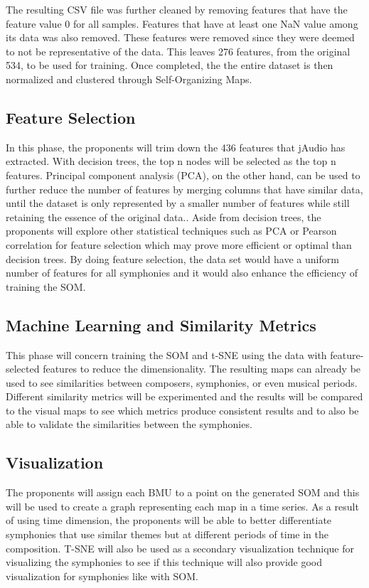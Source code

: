 The resulting CSV file was further cleaned by removing features that have the feature value 0 for all samples. Features that have at least one NaN value among its data was also removed. These features were removed since they were deemed to not be representative of the data. This leaves 276 features, from the original 534, to be used for training. Once completed, the the entire dataset is then normalized and clustered through Self-Organizing Maps.

\subsection{Feature Selection}
In this phase, the proponents will trim down the 436 features that jAudio has extracted. With decision trees, the top n nodes will be selected as the top n features. Principal component analysis (PCA), on the other hand, can be used to further reduce the number of features by merging columns that have similar data, until the dataset is only represented by a smaller number of features while still retaining the essence of the original data.. Aside from decision trees, the proponents will explore other statistical techniques such as PCA or Pearson correlation for feature selection which may prove more efficient or optimal than decision trees. By doing feature selection, the data set would have a uniform number of features for all symphonies and it would also enhance the efficiency of training the SOM.

\subsection{Machine Learning and Similarity Metrics}
This phase will concern training the SOM and t-SNE using the data with feature-selected features to reduce the dimensionality. The resulting maps can already be used to see similarities between composers, symphonies, or even musical periods. Different similarity metrics will be experimented and the results will be compared to the visual maps to see which metrics produce consistent results and to also be able to validate the similarities between the symphonies.

\subsection{Visualization}
The proponents will assign each BMU to a point on the generated SOM and this will be used to create a graph representing each map in a time series. As a result of using time dimension,  the proponents will be able to better differentiate symphonies that use similar themes but at different periods of time in the composition. T-SNE will also be used as a secondary visualization technique for visualizing the symphonies to see if this technique will also provide good visualization for symphonies like with SOM.

